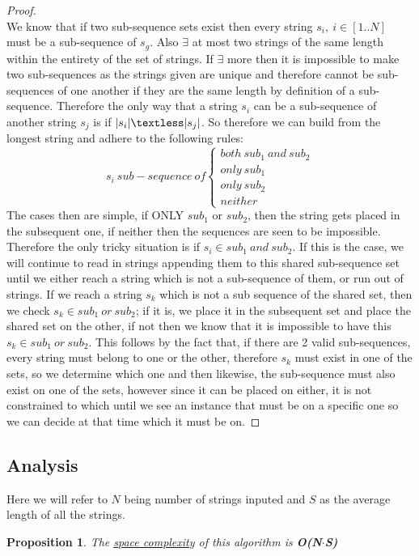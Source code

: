 \documentclass[12pt]{article}
\newtheorem{proposition}[theorem]{Proposition}
\begin{document}
\begin{proof}
~ \\ \indent We know that if two sub-sequence sets exist then every string $s_i,\ i \in [1..N]$ must be a
sub-sequence of $s_g$. Also $\exists$ at most two strings of the same length within the entirety of the set
of strings. If $\exists$ more then it is impossible to make two sub-sequences as the strings given are unique
and therefore cannot be sub-sequences of one another if they are the same length by definition of a sub-sequence.
Therefore the only way that a string $s_i$ can be a sub-sequence of another string $s_j$ is if $|s_i| \textless |s_j|$.
So therefore we can build from the longest string and adhere to the following rules:
\[ s_i\ sub-sequence\ of
\begin{cases}
    both\ sub_1\ and\ sub_2 \\
    only\ sub_1             \\
    only\ sub_2             \\
    neither
\end{cases}
\]
The cases then are simple, if ONLY $sub_1$ or $sub_2$, then the string gets placed in the subsequent one, if neither
then the sequences are seen to be impossible. Therefore the only tricky situation is if $s_i \in sub_1\ and\ sub_2$.
If this is the case, we will continue to read in strings appending them to this shared sub-sequence set until we
either reach a string which is not a sub-sequence of them, or run out of strings. If we reach a string $s_k$ which is
not a sub sequence of the shared set, then we check $s_k \in sub_1\ or\ sub_2$; if it is, we place it in the subsequent
set and place the shared set on the other, if not then we know that it is impossible to have this
$s_k \in sub_1\ or\ sub_2$. This follows by the fact that, if there are 2 valid sub-sequences, every string must belong
to one or the other, therefore $s_k$ must exist in one of the sets, so we determine which one and then likewise, the
sub-sequence must also exist on one of the sets, however since it can be placed on either, it is not constrained to
which until we see an instance that must be on a specific one so we can decide at that time which it must be on.
\end{proof}

\subsection{Analysis}
Here we will refer to $N$ being number of strings inputed and $S$ as the average length of all the strings.
\begin{proposition}
\label{numq}
The \underline{space complexity} of this algorithm is \textbf{O(N$\cdot$S)}
\end{proposition}
\end{document}
